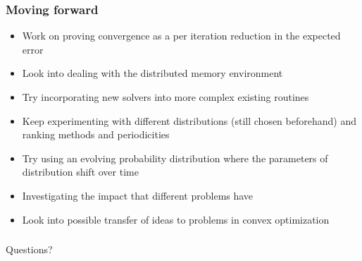 \documentclass{beamer}
\begin{document}
\begin{frame}
	\frametitle{Moving forward}
	\begin{itemize}
		\item Work on proving convergence as a per iteration reduction in the expected error
		\item Look into dealing with the distributed memory environment
		\item Try incorporating new solvers into more complex existing routines
		\item Keep experimenting with different distributions (still chosen beforehand) and ranking methods and periodicities
		\item Try using an evolving probability distribution where the parameters of distribution shift over time
		\item Investigating the impact that different problems have
		\item Look into possible transfer of ideas to problems in convex optimization
	\end{itemize}
\end{frame}
 
\begin{frame}
	\frametitle{}
	\begin{center}
	    Questions? 
	\end{center}
    
\end{frame}
\end{document}
